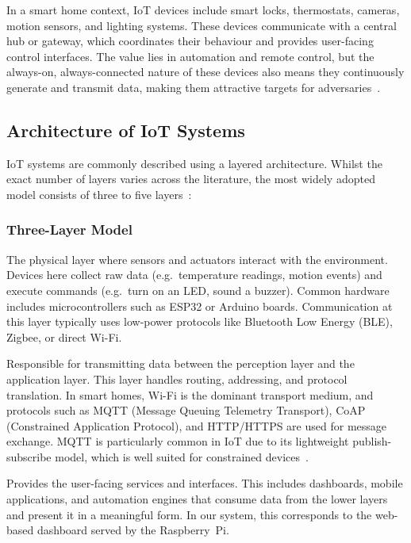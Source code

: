 \documentclass[12pt,a4paper]{article}
\begin{document}
In a smart home context, IoT devices include smart locks, thermostats, cameras, motion sensors, and lighting systems. These devices communicate with a central hub or gateway, which coordinates their behaviour and provides user-facing control interfaces. The value lies in automation and remote control, but the always-on, always-connected nature of these devices also means they continuously generate and transmit data, making them attractive targets for adversaries~\cite{atzori2010iot, alfuqaha2015iot}.

\subsection{Architecture of IoT Systems}
\label{sec:architecture}

IoT systems are commonly described using a layered architecture. Whilst the exact number of layers varies across the literature, the most widely adopted model consists of three to five layers~\cite{khan2012future, wu2010architecture}:

\subsubsection*{Three-Layer Model}

\begin{description}[style=nextline]
    \item[Perception Layer (Device Layer)]
    The physical layer where sensors and actuators interact with the environment. Devices here collect raw data (e.g.\ temperature readings, motion events) and execute commands (e.g.\ turn on an LED, sound a buzzer). Common hardware includes microcontrollers such as ESP32 or Arduino boards. Communication at this layer typically uses low-power protocols like Bluetooth Low Energy (BLE), Zigbee, or direct Wi-Fi.

    \item[Network Layer (Transport Layer)]
    Responsible for transmitting data between the perception layer and the application layer. This layer handles routing, addressing, and protocol translation. In smart homes, Wi-Fi is the dominant transport medium, and protocols such as MQTT (Message Queuing Telemetry Transport), CoAP (Constrained Application Protocol), and HTTP/HTTPS are used for message exchange. MQTT is particularly common in IoT due to its lightweight publish-subscribe model, which is well suited for constrained devices~\cite{banks2014mqtt}.

    \item[Application Layer]
    Provides the user-facing services and interfaces. This includes dashboards, mobile applications, and automation engines that consume data from the lower layers and present it in a meaningful form. In our system, this corresponds to the web-based dashboard served by the Raspberry~Pi.
\end{description}
\end{document}
